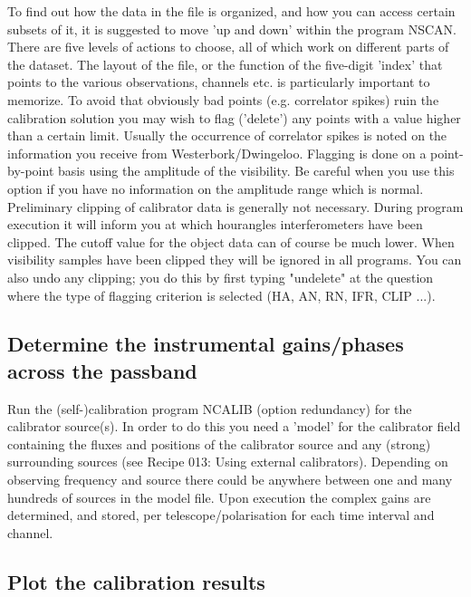 To find out how the data in the file is organized, and how you can access
certain subsets of it, it is suggested to move 'up and down' within the program
NSCAN. There are five levels of actions to choose, all of which work on
different parts of the dataset. The layout of the file, or the function of the
five-digit 'index' that points to the various observations, channels etc. is
particularly important to memorize. To avoid that obviously bad points (e.g.
correlator spikes) ruin the calibration solution you may wish to flag
('delete') any points with a value higher than a certain limit.  Usually the
occurrence of correlator spikes is noted on the information you receive from
Westerbork/Dwingeloo. Flagging is done on a point-by-point basis using the
amplitude of the visibility. Be careful when you use this option if you have no
information on the amplitude range which is normal. Preliminary clipping of
calibrator data is generally not necessary. During program execution it will
inform you at which hourangles interferometers have been clipped.  The cutoff
value for the object data can of course be much lower. When visibility samples
have been clipped they will be ignored in all programs. You can also undo any
clipping; you do this by first typing "undelete" at the question where the type
of flagging criterion is selected (HA, AN, RN, IFR, CLIP ...). 

\subsection{Determine the instrumental gains/phases across the passband} 
\label{.detail.passband} 

Run the (self-)calibration program NCALIB (option redundancy) for the
calibrator source(s). In order to do this you need a 'model' for the calibrator
field containing the fluxes and positions of the calibrator source and any
(strong) surrounding sources (see Recipe 013: Using external calibrators).
Depending on observing frequency and source there could be anywhere between one
and many hundreds of sources in the model file. Upon execution the complex
gains are determined, and stored, per telescope/polarisation for each time
interval and channel. 

\subsection{Plot the calibration results} 
\label{.detail.plotcal} 

